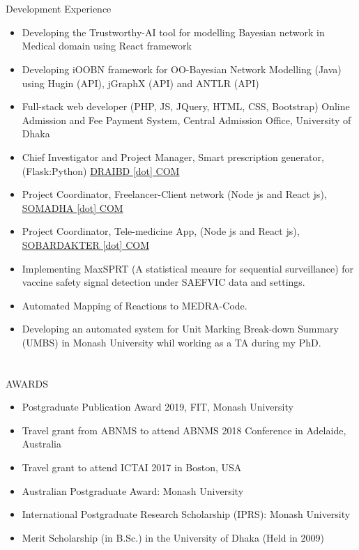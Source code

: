 \documentclass{my_cv}
\begin{document}
\section{\faBuilding}{Development Experience}
\begin{itemize}[noitemsep]
    \item Developing the Trustworthy-AI tool for modelling Bayesian network in Medical domain using React framework
    \item Developing iOOBN framework for OO-Bayesian Network Modelling (Java) using Hugin (API), jGraphX (API) and ANTLR (API)
    \item Full-stack web developer (PHP, JS, JQuery, HTML, CSS, Bootstrap)
Online Admission and Fee Payment System, Central Admission Office, University of Dhaka
    \item Chief Investigator and Project Manager, Smart prescription generator, (Flask:Python) \href{http://draibd.com}{DRAIBD [dot] COM}
    \item Project Coordinator, Freelancer-Client network (Node js and React js), \href{https://somadha.com}{SOMADHA [dot] COM}
    \item Project Coordinator, Tele-medicine App, (Node js and React js), \href{https://sobardakter.com}{SOBARDAKTER [dot] COM}
    \item Implementing MaxSPRT (A statistical meaure for sequential surveillance) for vaccine safety signal detection under SAEFVIC data and settings.
    \item Automated Mapping of Reactions to MEDRA-Code.
    \item Developing an automated system for Unit Marking Break-down Summary (UMBS) in Monash University whil working as a TA during my PhD.
\end{itemize}

\section{\faTrophy}{AWARDS}
\begin{itemize}[noitemsep]
    \item Postgraduate Publication Award 2019, FIT, Monash University
    \item Travel grant from ABNMS to attend ABNMS 2018 Conference in Adelaide, Australia
    \item Travel grant to attend ICTAI 2017 in Boston, USA
    \item Australian Postgraduate Award: Monash University
    \item International Postgraduate Research Scholarship (IPRS): Monash University 
    \item Merit Scholarship (in B.Sc.) in the University of Dhaka (Held in 2009) 
\end{itemize}
\end{document}
